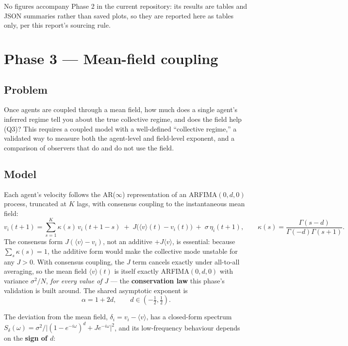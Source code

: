 \documentclass[11pt]{article}
\begin{document}
No figures accompany Phase 2 in the current repository: its results are
tables and JSON summaries rather than saved plots, so they are reported
here as tables only, per this report's sourcing rule.

\clearpage
\section{Phase 3 --- Mean-field coupling}
\label{sec:phase3}

\subsection{Problem}

Once agents are coupled through a mean field, how much does a single agent's
inferred regime tell you about the true collective regime, and does the
field help (Q3)? This requires a coupled model with a well-defined
``collective regime,'' a validated way to measure both the agent-level and
field-level exponent, and a comparison of observers that do and do not use the
field.

\subsection{Model}

Each agent's velocity follows the AR($\infty$) representation of an
ARFIMA$(0,d,0)$ process, truncated at $K$ lags, with consensus coupling to the
instantaneous mean field:
\[
v_i(t+1) = \sum_{s=1}^{K}\kappa(s)\,v_i(t+1-s) \;+\; J\big(\langle v\rangle(t) - v_i(t)\big) \;+\; \sigma\,\eta_i(t+1),
\qquad
\kappa(s) = \frac{\Gamma(s-d)}{\Gamma(-d)\Gamma(s+1)}.
\]
The consensus form $J(\langle v\rangle - v_i)$, not an additive $+J\langle
v\rangle$, is essential: because $\sum_s\kappa(s)=1$, the additive form would
make the collective mode unstable for any $J>0$. With consensus coupling, the
$J$ term cancels exactly under all-to-all averaging, so the mean field
$\langle v\rangle(t)$ is itself exactly ARFIMA$(0,d,0)$ with variance
$\sigma^2/N$, \emph{for every value of $J$} --- the \textbf{conservation law}
this phase's validation is built around. The shared asymptotic exponent is
\[
\alpha = 1+2d, \qquad d\in(-\tfrac12,\tfrac12).
\]

The deviation from the mean field, $\delta_i=v_i-\langle v\rangle$, has a
closed-form spectrum
$S_\delta(\omega) = \sigma^2 / \big|(1-e^{-i\omega})^d + Je^{-i\omega}\big|^2$,
and its low-frequency behaviour depends on the \textbf{sign of $d$}:
\end{document}
